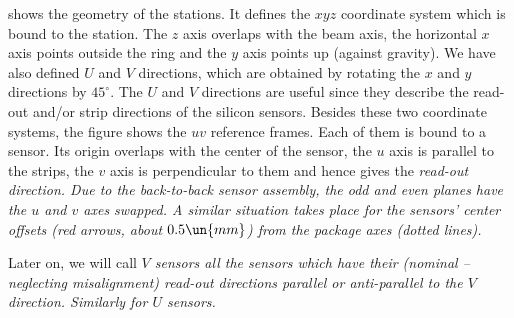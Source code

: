 

 shows the geometry of the  stations. It defines the $xyz$ coordinate system which is bound to the station. The $z$ axis overlaps with the beam axis, the horizontal $x$ axis points outside the  ring and the $y$ axis points up (against gravity). We have also defined $U$ and $V$ directions, which are obtained by rotating the $x$ and $y$ directions by $45^\circ$. The $U$ and $V$ directions are useful since they describe the read-out and/or strip directions of the silicon sensors. Besides these two coordinate systems, the figure shows the $uv$ reference frames. Each of them is bound to a sensor. Its origin overlaps with the center of the sensor, the $u$ axis is parallel to the strips, the $v$ axis is perpendicular to them and hence gives the \em{read-out direction}. Due to the back-to-back sensor assembly, the odd and even planes have the $u$ and $v$ axes swapped. A similar situation takes place for the sensors' center offsets (red arrows, about $0.5\un{mm}$) from the package axes (dotted lines).

Later on, we will call \em{$V$ sensors} all the sensors which have their (nominal -- neglecting misalignment) read-out directions parallel or anti-parallel to the $V$ direction. Similarly for $U$ sensors.



